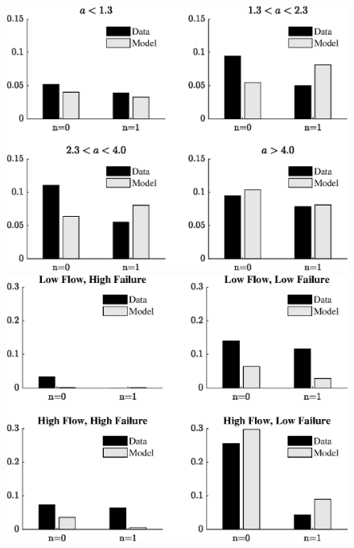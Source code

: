 \documentclass[hidelinks,12pt]{article}
\begin{document}
\begin{figure}
\begin{center}
\includegraphics[scale=0.8]{model_fit3.eps}\\[20pt]
\includegraphics[scale=0.8]{model_fit5.eps}
\end{center}
\end{figure}
\end{document}
